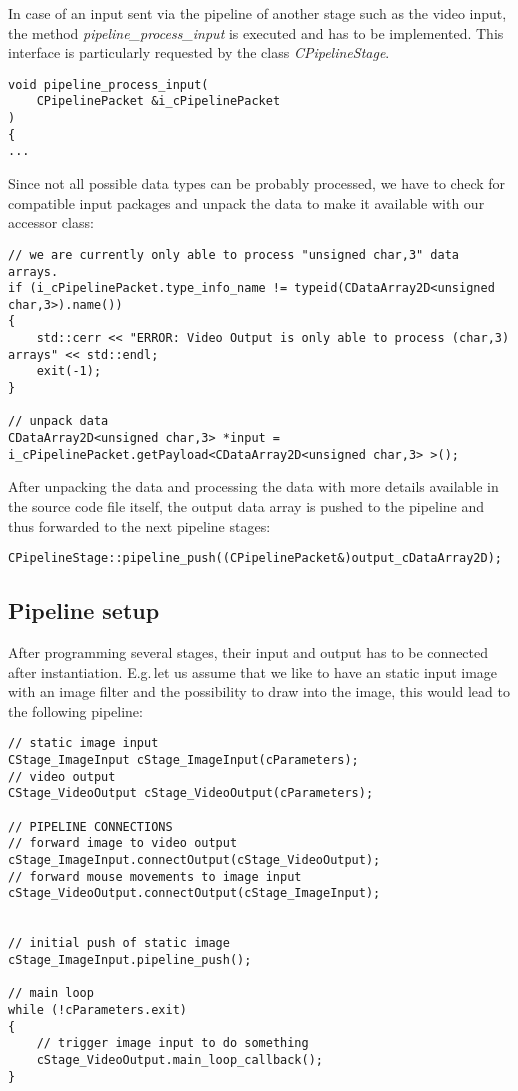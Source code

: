 \documentclass[11pt,a4paper]{article}
\begin{document}
\noindent
In case of an input sent via the pipeline of another stage such as the video
input, the method \textit{pipeline\_process\_input} is executed and has to be
implemented. This interface is particularly requested by the class
\textit{CPipelineStage}.

\begin{lstlisting}
void pipeline_process_input(
	CPipelinePacket &i_cPipelinePacket
)
{
...
\end{lstlisting}

\noindent
Since not all possible data types can be probably processed, we have to check
for compatible input packages and unpack the data to make it available with our
accessor class:
\begin{lstlisting}
// we are currently only able to process "unsigned char,3" data arrays.
if (i_cPipelinePacket.type_info_name != typeid(CDataArray2D<unsigned char,3>).name())
{
	std::cerr << "ERROR: Video Output is only able to process (char,3) arrays" << std::endl;
	exit(-1);
}

// unpack data
CDataArray2D<unsigned char,3> *input = i_cPipelinePacket.getPayload<CDataArray2D<unsigned char,3> >();
\end{lstlisting}

\noindent
After unpacking the data and processing the data with more details available in
the source code file itself, the output data array is pushed to the pipeline and
thus forwarded to the next pipeline stages:
\begin{lstlisting}
CPipelineStage::pipeline_push((CPipelinePacket&)output_cDataArray2D);
\end{lstlisting}

%
\subsection{Pipeline setup}

After programming several stages, their input and output has to be
connected after instantiation.
E.g.\,let us assume that we like to have an static input image with an image
filter and the possibility to draw into the image, this would lead to the
following pipeline:

\begin{lstlisting}
// static image input
CStage_ImageInput cStage_ImageInput(cParameters);
// video output
CStage_VideoOutput cStage_VideoOutput(cParameters);

// PIPELINE CONNECTIONS
// forward image to video output
cStage_ImageInput.connectOutput(cStage_VideoOutput);
// forward mouse movements to image input
cStage_VideoOutput.connectOutput(cStage_ImageInput);


// initial push of static image
cStage_ImageInput.pipeline_push();

// main loop
while (!cParameters.exit)
{
	// trigger image input to do something
	cStage_VideoOutput.main_loop_callback();
}
\end{lstlisting}
\end{document}
